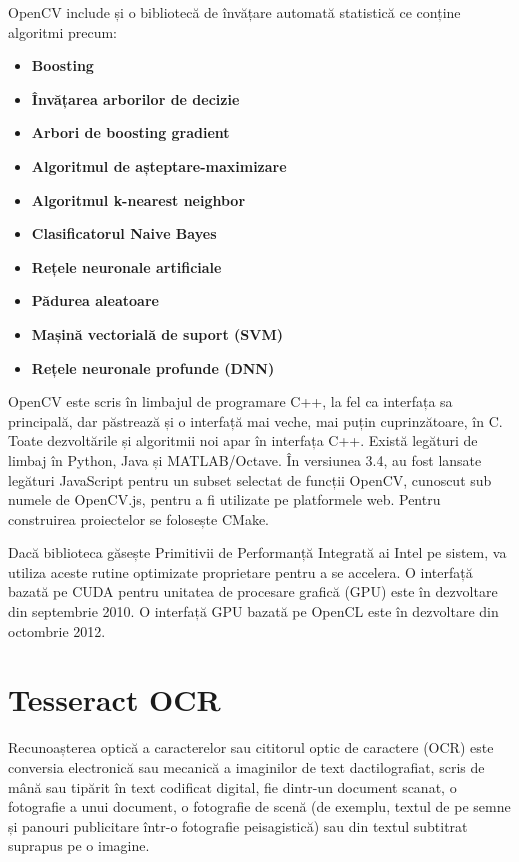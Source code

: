 \documentclass[a4paper,12pt]{report}
\begin{document}
OpenCV include și o bibliotecă de învățare automată statistică ce conține algoritmi precum:
\begin{itemize}
    \item \textbf{Boosting}
    \item \textbf{Învățarea arborilor de decizie}
    \item \textbf{Arbori de boosting gradient}
    \item \textbf{Algoritmul de așteptare-maximizare}
    \item \textbf{Algoritmul k-nearest neighbor}
    \item \textbf{Clasificatorul Naive Bayes}
    \item \textbf{Rețele neuronale artificiale}
    \item \textbf{Pădurea aleatoare}
    \item \textbf{Mașină vectorială de suport (SVM)}
    \item \textbf{Rețele neuronale profunde (DNN)}
\end{itemize}

OpenCV este scris în limbajul de programare C++, la fel ca interfața sa principală, dar păstrează și o interfață mai veche, mai puțin cuprinzătoare, în C.  Toate dezvoltările și algoritmii noi apar în interfața C++. Există legături de limbaj în Python, Java și MATLAB/Octave. În versiunea 3.4, au fost lansate legături JavaScript pentru un subset selectat de funcții OpenCV, cunoscut sub numele de OpenCV.js, pentru a fi utilizate pe platformele web. Pentru construirea proiectelor se folosește CMake.

Dacă biblioteca găsește Primitivii de Performanță Integrată ai Intel pe sistem, va utiliza aceste rutine optimizate proprietare pentru a se accelera. O interfață bazată pe CUDA pentru unitatea de procesare grafică (GPU) este în dezvoltare din septembrie 2010. O interfață GPU bazată pe OpenCL este în dezvoltare din octombrie 2012.

\section{Tesseract OCR}
Recunoașterea optică a caracterelor sau cititorul optic de caractere (OCR) este conversia electronică sau mecanică a imaginilor de text dactilografiat, scris de mână sau tipărit în text codificat digital, fie dintr-un document scanat, o fotografie a unui document, o fotografie de scenă (de exemplu, textul de pe semne și panouri publicitare într-o fotografie peisagistică) sau din textul subtitrat suprapus pe o imagine.
\end{document}
